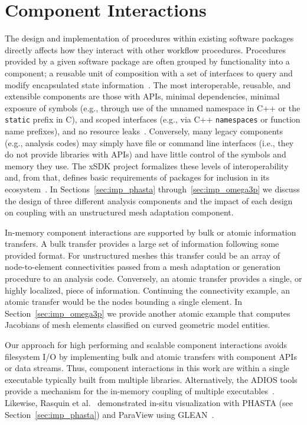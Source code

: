 \section{Component Interactions} \label{sec:imp_Coupling}
The design and implementation of procedures within existing software packages
directly affects how they interact with other workflow procedures.
Procedures provided by a given software package are often grouped by
functionality into a component; a reusable unit of composition with a set of
interfaces to query and modify encapsulated state
information~\cite{Szyperski02}.
The most interoperable, reusable, and extensible components are those with APIs,
minimal dependencies, minimal exposure of symbols (e.g., through use of the
unnamed namespace in C++ or the \texttt{static} prefix in C), and
scoped interfaces (e.g., via C++ \texttt{namespaces} or function name prefixes),
and no resource leaks~\cite{Miller2004,brownKnepleySmith,Gropp_1999}.
Conversely, many legacy components (e.g., analysis codes) may simply have file or
command line interfaces (i.e., they do not provide libraries with APIs) and
have little control of the symbols and memory they use.
The xSDK project formalizes these levels of interoperability and, from that,
defines basic requirements of packages for inclusion in its
ecosystem~\cite{xsdkPackagePolicies2016}.
In Sections~\ref{sec:imp_phasta} through~\ref{sec:imp_omega3p} we discuss the
design of three different analysis components and the impact of each design on
coupling with an unstructured mesh adaptation component.

In-memory component interactions are supported by bulk or atomic information
transfers.
A bulk transfer provides a large set of information following some provided
format.
For unstructured meshes this transfer could be an array of node-to-element
connectivities passed from a mesh adaptation or generation procedure to an
analysis code.
Conversely, an atomic transfer provides a single, or highly localized, piece of
information.
Continuing the connectivity example, an atomic transfer would be the nodes
bounding a single element.
In Section~\ref{sec:imp_omega3p} we provide another atomic example that computes
Jacobians of mesh elements classified on curved geometric model entities.

Our approach for high performing and scalable component interactions avoids
filesystem I/O by implementing bulk and atomic transfers with component APIs or
data streams.
Thus, component interactions in this work are within a single executable typically
built from multiple libraries.
Alternatively, the ADIOS tools provide a mechanism for the in-memory
coupling of multiple executables~\cite{bennett2012combining,zhang2012enabling}.
Likewise, Rasquin et al.~\cite{RasquinSC11Poster} demonstrated in-situ
visualization with PHASTA (see Section~\ref{sec:imp_phasta}) and
ParaView using GLEAN~\cite{glean2011}.


